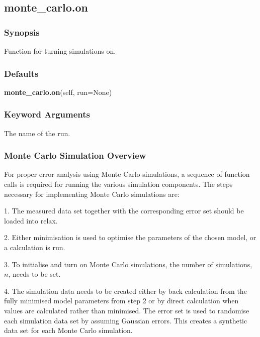 \newpage

\subsection{monte\_carlo.on}


\subsubsection{Synopsis}

Function for turning simulations on.



\subsubsection{Defaults}

\textsf{\textbf{monte\_carlo.on}(self, run=None)}


\subsubsection{Keyword Arguments}

  The name of the run. 




\subsubsection{Monte Carlo Simulation Overview}

For proper error analysis using Monte Carlo simulations, a sequence of function calls is required for running the various simulation components.  The steps necessary for implementing Monte Carlo simulations are:


1.  The measured data set together with the corresponding error set should be loaded into relax.


2.  Either minimisation is used to optimise the parameters of the chosen model, or a calculation is run.


3.  To initialise and turn on Monte Carlo simulations, the number of simulations, $n$, needs to be set.


4.  The simulation data needs to be created either by back calculation from the fully minimised model parameters from step 2 or by direct calculation when values are calculated rather than minimised.  The error set is used to randomise each simulation data set by assuming Gaussian errors.  This creates a synthetic data set for each Monte Carlo simulation.


